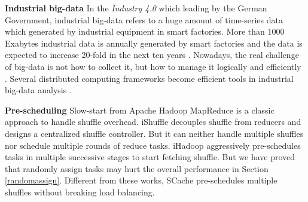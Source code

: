 {\textbf{Industrial big-data}
In the \textit{Industry 4.0} which leading by the German Government, industrial big-data refers to a huge amount of time-series data which generated by industrial equipment in smart factories.
More than 1000 Exabytes industrial data is annually generated by smart factories and the data is expected to increase 20-fold in the next ten years \cite{yin2015big}.
Nowadays, the real challenge of big-data is not how to collect it, but how to manage it logically and efficiently \cite{lv2017next}.
Several distributed computing frameworks become efficient tools in industrial big-data analysis \cite{lade2017manufacturing, li2016scientific, ur2018big}.
}


\textbf{Pre-scheduling} 
Slow-start from Apache Hadoop MapReduce is a classic approach to handle shuffle overhead. 
iShuffle \cite{guo2017ishuffle} decouples shuffle from reducers and designs a centralized shuffle controller. 
But it can neither handle multiple shuffles nor schedule multiple rounds of reduce tasks. 
iHadoop \cite{ihadoop} aggressively pre-schedules tasks in multiple successive stages to start fetching shuffle. 
But we have proved that randomly assign tasks may hurt the overall performance in Section \ref{randomassign}. 
Different from these works, SCache pre-schedules multiple shuffles without breaking load balancing. 


